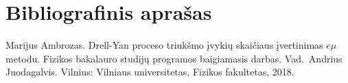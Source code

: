 \documentclass[a4paper, 12pt]{article}
\begin{document}
\clearpage
\section*{Bibliografinis aprašas}
Marijus Ambrozas. Drell-Yan proceso triukšmo įvykių skaičiaus įvertinimas $e\mu$ metodu. Fizikos bakalauro studijų programos baigiamasis darbas. Vad.\ Andrius Juodagalvis. Vilnius: Vilniaus universitetas, Fizikos fakultetas, 2018.

\end{document}
